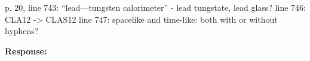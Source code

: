 \documentclass[10pt,aps,prl,amsmath,amssymb,superscriptaddress,nofootinbib,showpacs,preprintnumbers,amsfonts, notitlepage]{revtex4-2}
\begin{document}
p. 20, line 743: “lead—tungsten calorimeter” - lead tungstate, lead glass?
line 746: CLA12 -> CLAS12
line 747: spacelike and time-like: both with or without hyphens?





\vskip 5pt 
{\bf Response: }




\end{document}
